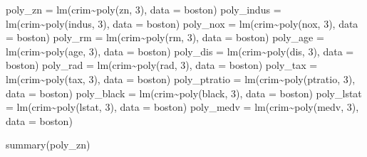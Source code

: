 \documentclass[
]{article}
\newenvironment{Shaded}{\begin{snugshade}}{\end{snugshade}}
\newcommand{\AttributeTok}[1]{\textcolor[rgb]{0.77,0.63,0.00}{#1}}
\newcommand{\DecValTok}[1]{\textcolor[rgb]{0.00,0.00,0.81}{#1}}
\newcommand{\FunctionTok}[1]{\textcolor[rgb]{0.00,0.00,0.00}{#1}}
\newcommand{\NormalTok}[1]{#1}
\newcommand{\OtherTok}[1]{\textcolor[rgb]{0.56,0.35,0.01}{#1}}
\newcommand{\SpecialCharTok}[1]{\textcolor[rgb]{0.00,0.00,0.00}{#1}}
\begin{document}
\begin{Shaded}
\begin{Highlighting}[]
\NormalTok{poly\_zn }\OtherTok{=} \FunctionTok{lm}\NormalTok{(crim}\SpecialCharTok{\textasciitilde{}}\FunctionTok{poly}\NormalTok{(zn, }\DecValTok{3}\NormalTok{), }\AttributeTok{data =}\NormalTok{ boston)}
\NormalTok{poly\_indus }\OtherTok{=} \FunctionTok{lm}\NormalTok{(crim}\SpecialCharTok{\textasciitilde{}}\FunctionTok{poly}\NormalTok{(indus, }\DecValTok{3}\NormalTok{), }\AttributeTok{data =}\NormalTok{ boston)}
\NormalTok{poly\_nox }\OtherTok{=} \FunctionTok{lm}\NormalTok{(crim}\SpecialCharTok{\textasciitilde{}}\FunctionTok{poly}\NormalTok{(nox, }\DecValTok{3}\NormalTok{), }\AttributeTok{data =}\NormalTok{ boston)}
\NormalTok{poly\_rm }\OtherTok{=} \FunctionTok{lm}\NormalTok{(crim}\SpecialCharTok{\textasciitilde{}}\FunctionTok{poly}\NormalTok{(rm, }\DecValTok{3}\NormalTok{), }\AttributeTok{data =}\NormalTok{ boston)}
\NormalTok{poly\_age }\OtherTok{=} \FunctionTok{lm}\NormalTok{(crim}\SpecialCharTok{\textasciitilde{}}\FunctionTok{poly}\NormalTok{(age, }\DecValTok{3}\NormalTok{), }\AttributeTok{data =}\NormalTok{ boston)}
\NormalTok{poly\_dis }\OtherTok{=} \FunctionTok{lm}\NormalTok{(crim}\SpecialCharTok{\textasciitilde{}}\FunctionTok{poly}\NormalTok{(dis, }\DecValTok{3}\NormalTok{), }\AttributeTok{data =}\NormalTok{ boston)}
\NormalTok{poly\_rad }\OtherTok{=} \FunctionTok{lm}\NormalTok{(crim}\SpecialCharTok{\textasciitilde{}}\FunctionTok{poly}\NormalTok{(rad, }\DecValTok{3}\NormalTok{), }\AttributeTok{data =}\NormalTok{ boston)}
\NormalTok{poly\_tax }\OtherTok{=} \FunctionTok{lm}\NormalTok{(crim}\SpecialCharTok{\textasciitilde{}}\FunctionTok{poly}\NormalTok{(tax, }\DecValTok{3}\NormalTok{), }\AttributeTok{data =}\NormalTok{ boston)}
\NormalTok{poly\_ptratio }\OtherTok{=} \FunctionTok{lm}\NormalTok{(crim}\SpecialCharTok{\textasciitilde{}}\FunctionTok{poly}\NormalTok{(ptratio, }\DecValTok{3}\NormalTok{), }\AttributeTok{data =}\NormalTok{ boston)}
\NormalTok{poly\_black }\OtherTok{=} \FunctionTok{lm}\NormalTok{(crim}\SpecialCharTok{\textasciitilde{}}\FunctionTok{poly}\NormalTok{(black, }\DecValTok{3}\NormalTok{), }\AttributeTok{data =}\NormalTok{ boston)}
\NormalTok{poly\_lstat }\OtherTok{=} \FunctionTok{lm}\NormalTok{(crim}\SpecialCharTok{\textasciitilde{}}\FunctionTok{poly}\NormalTok{(lstat, }\DecValTok{3}\NormalTok{), }\AttributeTok{data =}\NormalTok{ boston)}
\NormalTok{poly\_medv }\OtherTok{=} \FunctionTok{lm}\NormalTok{(crim}\SpecialCharTok{\textasciitilde{}}\FunctionTok{poly}\NormalTok{(medv, }\DecValTok{3}\NormalTok{), }\AttributeTok{data =}\NormalTok{ boston)}

\FunctionTok{summary}\NormalTok{(poly\_zn)}
\end{Highlighting}
\end{Shaded}
\end{document}
